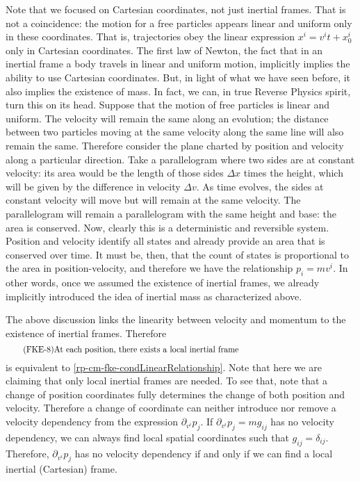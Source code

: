 Note that we focused on Cartesian coordinates, not just inertial frames. That is not a coincidence: the motion for a free particles appears linear and uniform only in these coordinates. That is, trajectories obey the linear expression $x^i = v^i t + x_0^i$ only in Cartesian coordinates. The first law of Newton, the fact that in an inertial frame a body travels in linear and uniform motion, implicitly implies the ability to use Cartesian coordinates. But, in light of what we have seen before, it also implies the existence of mass. In fact, we can, in true Reverse Physics spirit, turn this on its head. Suppose that the motion of free particles is linear and uniform. The velocity will remain the same along an evolution; the distance between two particles moving at the same velocity along the same line will also remain the same. Therefore consider the plane charted by  position and velocity along a particular direction. Take a parallelogram where two sides are at constant velocity: its area would be the length of those sides $\Delta x$ times the height, which will be given by the difference in velocity $\Delta v$. As time evolves, the sides at constant velocity will move but will remain at the same velocity. The parallelogram will remain a parallelogram with the same height and base: the area is conserved. Now, clearly this is a deterministic and reversible system. Position and velocity identify all states and already provide an area that is conserved over time. It must be, then, that the count of states is proportional to the area in position-velocity, and therefore we have the relationship $p_i=mv^i$. In other words, once we assumed the existence of inertial frames, we already implicitly introduced the idea of inertial mass as characterized above.

The above discussion links the linearity between velocity and momentum to the existence of inertial frames. Therefore
\begin{equation}
	\tag{FKE-8}\label{rp-cm-fke-condInertial}
	\parbox{5in}{At each position, there exists a local inertial frame}
\end{equation}
is equivalent to \ref{rp-cm-fke-condLinearRelationship}. Note that here we are claiming that only local inertial frames are needed. To see that, note that a change of position coordinates fully determines the change of both position and velocity. Therefore a change of coordinate can neither introduce nor remove a velocity dependency from the expression $\partial_{v^i} p_j$. If $\partial_{v^i} p_j = m g_{ij}$ has no velocity dependency, we can always find local spatial coordinates such that $g_{ij}=\delta_{ij}$. Therefore, $\partial_{v^i} p_j$ has no velocity dependency if and only if we can find a local inertial (Cartesian) frame.

